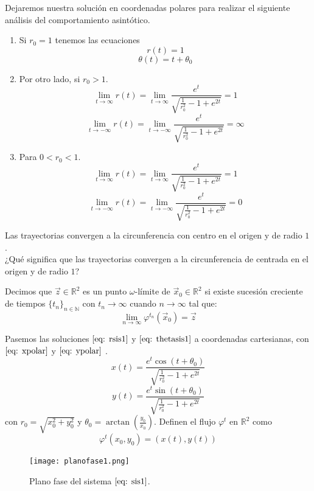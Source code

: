 Dejaremos nuestra solución en coordenadas polares para realizar el siguiente
análisis del comportamiento asintótico.\\
\begin{enumerate}
	\item Si $r_0=1$ tenemos las ecuaciones
	      $$r(t)=1$$
	      $$\theta(t)=t+\theta_0$$
	\item Por otro lado, si $r_0>1$.
	      $$\lim_{t\to\infty}r(t)=\lim_{t\to\infty}\frac{e^t}{\sqrt{\frac{1}{r_0^2}-1+e^{2t}}}=1$$
	      $$\lim_{t\to-\infty}r(t)=\lim_{t\to-\infty}\frac{e^t}{\sqrt{\frac{1}{r_0^2}-1+e^{2t}}}=\infty$$
	\item Para $0<r_0<1$.
	      $$\lim_{t\to\infty}r(t)=\lim_{t\to\infty}\frac{e^t}{\sqrt{\frac{1}{r_0^2}-1+e^{2t}}}=1$$
	      $$\lim_{t\to-\infty}r(t)=\lim_{t\to-\infty}\frac{e^t}{\sqrt{\frac{1}{r_0^2}-1+e^{2t}}}=0$$
\end{enumerate}
Las trayectorias convergen a la circunferencia con centro en el origen
y de radio  $1$.\\

¿Qué significa que las trayectorias convergen a la circunferencia de centrada en el origen y de radio $1$?

\begin{definition} 
	Decimos que $\vec{z}\in\mathbb{R}^2$ es un punto $\omega$-límite
	de $\vec{x}_0\in\mathbb{R}^2$ si existe sucesión creciente de
	tiempos $\{t_n\}_{n\in\mathbb{N}}$
	con $t_n \to\infty$ cuando $n\to \infty$ tal que:
	$$\lim_{n\to\infty}\varphi^{t_n}(\vec{x}_0)=\vec{z}$$
\end{definition}

Pasemos las soluciones $\eqref{eq: rsis1}$ y $\eqref{eq: thetasis1}$ a coordenadas cartesianas, con $\eqref{eq: xpolar}$ y $\eqref{eq: ypolar}$ \cite{guckenheimer1983nonlinear}.
\begin{equation}\label{eq: xsis1}
	x(t)=\frac{e^t\cos(t+\theta_0)}{\sqrt{\frac{1}{r_0^2}-1+e^{2t}}}
\end{equation}
\begin{equation}\label{eq: ysis1}
	y(t)=\frac{e^t\sin(t+\theta_0)}{\sqrt{\frac{1}{r_0^2}-1+e^{2t}}}
\end{equation}
con $r_0=\sqrt{x_0^2+y_0^2}$ y $\theta_0=\arctan(\frac{y_0}{x_0})$. Definen el flujo $\varphi^t$ en $\mathbb{R}^2$ como
$$\varphi^t(x_0,y_0)=(x(t),y(t))$$

\begin{figure}[h]
	\centering
	\texttt{[image: planofase1.png]}
	\caption{Plano fase del sistema $\eqref{eq: sis1}$.}
\end{figure}

